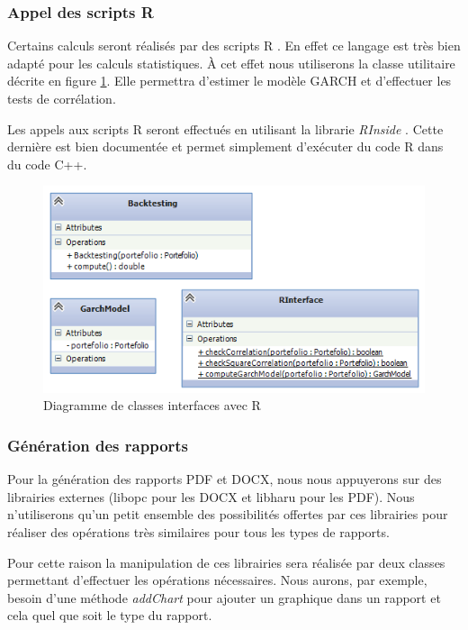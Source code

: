 \documentclass[a4paper,titlepage,french]{report}
\begin{document}
\subsubsection{Appel des scripts R}

Certains calculs seront réalisés par des scripts R \cite{website:R}.
En effet ce langage est très bien adapté pour les calculs statistiques.
\`A cet effet nous utiliserons la classe utilitaire décrite en figure \ref{fig:diagramme-classes-interface-r}.
Elle permettra d'estimer le modèle GARCH et d'effectuer les tests de corrélation.

Les appels aux scripts R seront effectués en utilisant la librarie \textit{RInside} \cite{website:RInside}. Cette dernière est bien documentée et permet simplement d'exécuter du code R dans du code C++.

\begin{figure}
  	\center
  	\includegraphics[width=1\textwidth]{diagramme-classes-interface-r.png}
  	\caption{Diagramme de classes interfaces avec R}
  	\label{fig:diagramme-classes-interface-r}
\end{figure}


\subsubsection{Génération des rapports}

Pour la génération des rapports PDF et DOCX, nous nous appuyerons sur des librairies externes (libopc \cite{website:libopc} pour les DOCX et libharu \cite{website:libharu} pour les PDF).
Nous n'utiliserons qu'un petit ensemble des possibilités offertes par ces librairies pour réaliser des opérations très similaires pour tous les types de rapports.

Pour cette raison la manipulation de ces librairies sera réalisée par deux classes permettant d'effectuer les opérations nécessaires.
Nous aurons, par exemple, besoin d'une méthode \textit{addChart} pour ajouter un graphique dans un rapport et cela quel que soit le type du rapport.
\end{document}
